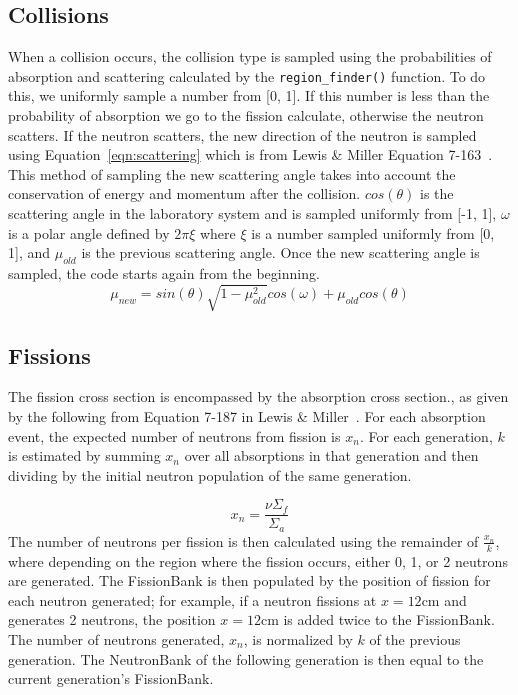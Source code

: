 \documentclass[letterpaper]{article}
\begin{document}
\subsection{Collisions}
When a collision occurs, the collision type is sampled using the probabilities of absorption and scattering calculated by the \texttt{region\_finder()} function. To do this, we uniformly sample a number from [0, 1]. If this number is less than the probability of absorption we go to the fission calculate, otherwise the neutron scatters. If the neutron scatters, the new direction of the neutron is sampled using Equation~\ref{eqn:scattering} which is from Lewis \& Miller Equation 7-163~\cite{LewisMiller}. This method of sampling the new scattering angle takes into account the conservation of energy and momentum after the collision. $cos(\theta)$ is the scattering angle in the laboratory system and is sampled uniformly from [-1, 1], $\omega$ is a polar angle defined by $2\pi\xi$ where $\xi$ is a number sampled uniformly from [0, 1], and $\mu_{old}$ is the previous scattering angle. Once the new scattering angle is sampled, the code starts again from the beginning.
\begin{equation}
    \mu_{new}=sin(\theta)\sqrt{1-\mu_{old}^2}cos(\omega)+\mu_{old}cos(\theta)
    \label{eqn:scattering}
\end{equation}


\subsection{Fissions}
\label{sec:fission}
The fission cross section is encompassed by the absorption cross section., as given by the following from Equation 7-187 in Lewis \& Miller~\cite{LewisMiller}. For each absorption event, the expected number of neutrons from fission is $x_n$. For each generation, $k$ is estimated by summing $x_n$ over all absorptions in that generation and then dividing by the initial neutron population of the same generation. 

\begin{equation}
    x_n=\frac{\nu\Sigma_f}{\Sigma_a}
\end{equation}
The number of neutrons per fission is then calculated using the remainder of $\frac{x_n}{k}$, where depending on the region where the fission occurs, either 0, 1, or 2 neutrons are generated. The FissionBank is then populated by the position of fission for each neutron generated; for example, if a neutron fissions at $x=12$cm and generates 2 neutrons, the position $x=12$cm is added twice to the FissionBank. The number of neutrons generated, $x_n$, is normalized by $k$ of the previous generation. The NeutronBank of the following generation is then equal to the current generation's FissionBank.
\end{document}
